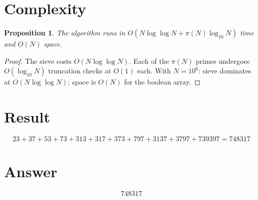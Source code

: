 \documentclass[12pt]{article}
\newtheorem{proposition}[theorem]{Proposition}
\theoremstyle{definition}
\begin{document}
\section{Complexity}

\begin{proposition}
The algorithm runs in $O(N \log \log N + \pi(N) \log_{10} N)$ time and $O(N)$ space.
\end{proposition}
\begin{proof}
The sieve costs $O(N \log \log N)$. Each of the $\pi(N)$ primes undergoes $O(\log_{10} N)$ truncation checks at $O(1)$ each. With $N = 10^6$: sieve dominates at $O(N \log \log N)$; space is $O(N)$ for the boolean array.
\end{proof}

\section{Result}
\[
    23 + 37 + 53 + 73 + 313 + 317 + 373 + 797 + 3137 + 3797 + 739397 = \boxed{748317}
\]

\section{Answer}

\[
\boxed{748317}
\]
\end{document}
